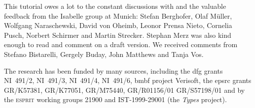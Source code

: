 This tutorial owes a lot to the constant discussions with and the valuable
feedback from the Isabelle group at Munich: Stefan Berghofer, Olaf
M{\"u}ller, Wolfgang Naraschewski, David von Oheimb, Leonor Prensa Nieto,
Cornelia Pusch, Norbert Schirmer and Martin Strecker. Stephan
Merz was also kind enough to read and comment on a draft version.  We
received comments from Stefano Bistarelli, Gergely Buday, John Matthews
and Tanja Vos.

The research has been funded by many sources, including the {\sc dfg} grants
NI~491/2, NI~491/3, NI~491/4, NI~491/6, {\sc bmbf} project Verisoft, the {\sc
epsrc} grants GR/K57381, GR/K77051, GR/M75440, GR/R01156/01 GR/S57198/01 and
by the \textsc{esprit} working groups 21900 and IST-1999-29001 (the
\emph{Types} project).
